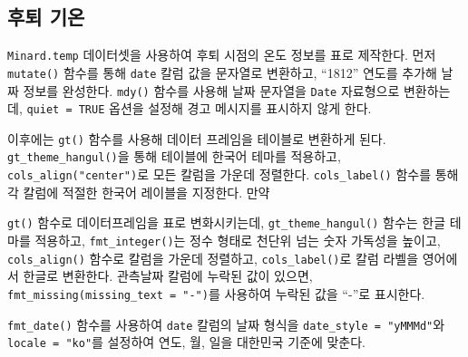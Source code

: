 \documentclass[
  letterpaper,
  chapter,a4paper,showtrims,openright,hidelinks]{oblivoir}
\begin{document}
\hypertarget{uxd6c4uxd1f4-uxae30uxc628}{%
\subsection{후퇴 기온}\label{uxd6c4uxd1f4-uxae30uxc628}}

\texttt{Minard.temp} 데이터셋을 사용하여 후퇴 시점의 온도 정보를 표로
제작한다. 먼저 \texttt{mutate()} 함수를 통해 \texttt{date} 칼럼 값을
문자열로 변환하고, ``1812'' 연도를 추가해 날짜 정보를 완성한다.
\texttt{mdy()} 함수를 사용해 날짜 문자열을 \texttt{Date} 자료형으로
변환하는데, \texttt{quiet\ =\ TRUE} 옵션을 설정해 경고 메시지를 표시하지
않게 한다.

이후에는 \texttt{gt()} 함수를 사용해 데이터 프레임을 테이블로 변환하게
된다. \texttt{gt\_theme\_hangul()}을 통해 테이블에 한국어 테마를
적용하고, \texttt{cols\_align("center")}로 모든 칼럼을 가운데 정렬한다.
\texttt{cols\_label()} 함수를 통해 각 칼럼에 적절한 한국어 레이블을
지정한다. 만약

\texttt{gt()} 함수로 데이터프레임을 표로 변화시키는데,
\texttt{gt\_theme\_hangul()} 함수는 한글 테마를 적용하고,
\texttt{fmt\_integer()}는 정수 형태로 천단위 넘는 숫자 가독성을 높이고,
\texttt{cols\_align()} 함수로 칼럼을 가운데 정렬하고,
\texttt{cols\_label()}로 칼럼 라벨을 영어에서 한글로 변환한다. 관측날짜
칼럼에 누락된 값이 있으면,
\texttt{fmt\_missing(missing\_text\ =\ "-")}를 사용하여 누락된 값을
``-''로 표시한다.

\texttt{fmt\_date()} 함수를 사용하여 \texttt{date} 칼럼의 날짜 형식을
\texttt{date\_style\ =\ "yMMMd"}와 \texttt{locale\ =\ "ko"}를 설정하여
연도, 월, 일을 대한민국 기준에 맞춘다.
\end{document}

